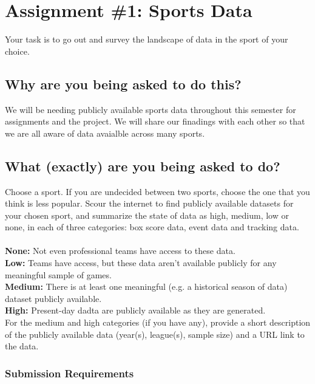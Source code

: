 \documentclass{article}
\begin{document}
  \section*{\sc Assignment \#1: Sports Data}

    Your task is to go out and survey the landscape of data in the sport of your choice.

    \subsection*{\sc Why are you being asked to do this?}

      We will be needing publicly available sports data throughout this semester for assignments and the project. We will share our finadings with each other so that we are all aware of data avaialble across many sports.

    \subsection*{\sc What (exactly) are you being asked to do?}

      Choose a sport. If you are undecided between two sports, choose the one that you think is less popular. Scour the internet to find publicly available datasets for your chosen sport, and summarize the state of data as high, medium, low or none, in each of three categories: box score data, event data and tracking data.\\
      ~\\
      {\bf None:} Not even professional teams have access to these data.\\
      {\bf Low:} Teams have access, but these data aren't available publicly for any meaningful sample of games.\\
      {\bf Medium:} There is at least one meaningful (e.g. a historical season of data) dataset publicly available.\\
      {\bf High:} Present-day dadta are publicly available as they are generated.\\
  
      For the medium and high categories (if you have any), provide a short description of the publicly available data (year(s), league(s), sample size) and a URL link to the data.

      \subsubsection*{\sc Submission Requirements}
\end{document}
